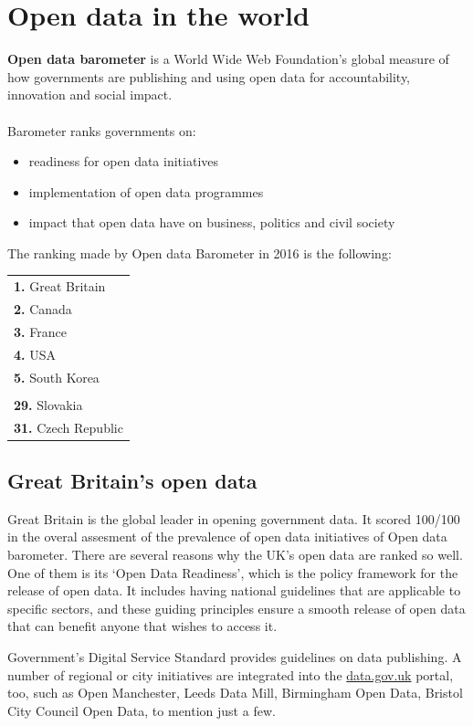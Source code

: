 \documentclass[thesis=B,english]{FITthesis}[2012/06/26]
\begin{document}
	\section{Open data in the world}
	\textbf{Open data barometer} is a World Wide Web Foundation's global measure of how governments are publishing and using open data for accountability, innovation and social impact.\cite{opendatabarometer} \paragraph{} Barometer ranks governments on:
\begin{itemize}
	\item readiness for open data initiatives
	\item implementation of open data programmes
	\item impact that open data have on business, politics and civil society
\end{itemize}
The ranking made by Open data Barometer in 2016 is the following:
\begin{center}
\begin{tabular}{l}
  \textbf{1.} Great Britain \\
  \textbf{2.} Canada \\
  \textbf{3.} France \\
  \textbf{4.} USA \\
  \textbf{5.} South Korea \\
  \\
  \textbf{29.} Slovakia \\
  \textbf{31.} Czech Republic \\
\end{tabular}
\end{center}
  \subsection{Great Britain's open data}
  Great Britain is the global leader in opening government data. It scored 100/100 in the overal assesment of the prevalence of open data initiatives of Open data barometer.
  There are several reasons why the UK's open data are ranked so well. One of them is its ‘Open Data Readiness’, which is the policy framework for the release of open data. It includes having national guidelines that are applicable to specific sectors, and these guiding principles ensure a smooth release of open data that can benefit anyone that wishes to access it.

Government’s Digital Service Standard provides guidelines on data publishing. A number of regional or city initiatives are integrated into the \linebreak\href{https://data.gov.uk}{data.gov.uk} portal, too, such as Open Manchester, Leeds Data Mill, Birmingham Open Data, Bristol City Council Open Data, to mention just a few.
\end{document}
